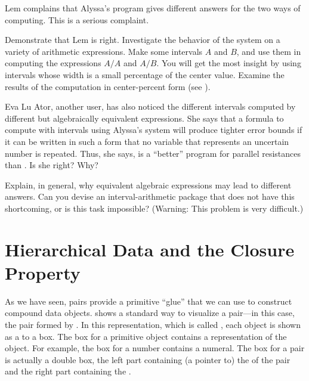 \begin{exerciseGroup}
Lem complains that Alyssa's program gives different answers for the two ways of
computing. This is a serious complaint.

\label{Exercise 2.14}
 Demonstrate that Lem is right.
Investigate the behavior of the system on a variety of arithmetic
expressions. Make some intervals \( A \) and \( B \), and use them in computing the
expressions \( A / A \) and \( A / B \).  You will get the most insight by
using intervals whose width is a small percentage of the center value. Examine
the results of the computation in center-percent form (see ).

\label{Exercise 2.15}
 Eva Lu Ator, another user, has
also noticed the different intervals computed by different but algebraically
equivalent expressions. She says that a formula to compute with intervals using
Alyssa's system will produce tighter error bounds if it can be written in such
a form that no variable that represents an uncertain number is repeated.  Thus,
she says,  is a ``better'' program for parallel resistances than
.  Is she right?  Why?

\label{Exercise 2.16}
 Explain, in general, why
equivalent algebraic expressions may lead to different answers.  Can you devise
an interval-arithmetic package that does not have this shortcoming, or is this
task impossible?  (Warning: This problem is very difficult.)
\end{exerciseGroup}


\section{Hierarchical Data and the Closure Property}
\label{Section 2.2}

As we have seen, pairs provide a primitive ``glue'' that we can use to
construct compound data objects.   shows a standard way to
visualize a pair---in this case, the pair formed by .  In this
representation, which is called , each object
is shown as a  to a box.  The box for a primitive object
contains a representation of the object.  For example, the box for a number
contains a numeral.  The box for a pair is actually a double box, the left part
containing (a pointer to) the  of the pair and the right part
containing the .

